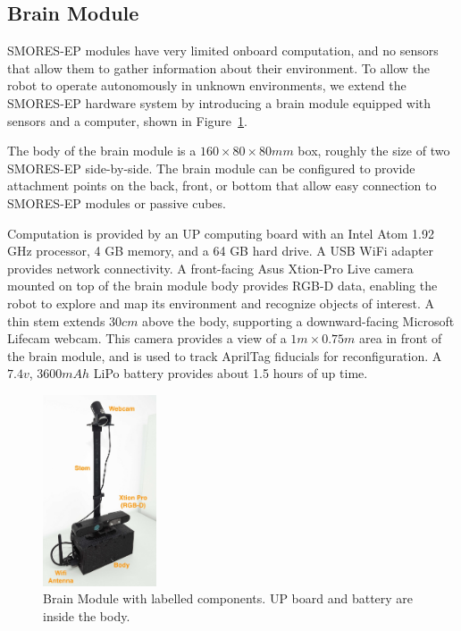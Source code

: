 \documentclass[conference]{IEEEtran}
\begin{document}
\subsection{Brain Module} %
\label{sec:sensor_module}
%
SMORES-EP modules have very limited onboard computation, and no sensors that allow them to gather information about their environment.  To allow the robot to operate autonomously in unknown environments, we extend the SMORES-EP hardware system by introducing a brain module equipped with sensors and a computer, shown in Figure~\ref{fig:sensor-module}.

The body of the brain module is a $160\times80\times80mm$ box, roughly the size of two SMORES-EP side-by-side.  The brain module can be configured to provide attachment points on the back, front, or bottom that allow easy connection to SMORES-EP modules or passive cubes.

Computation is provided by an UP computing board with an Intel Atom 1.92 GHz processor, 4 GB memory, and a 64 GB hard drive. A USB WiFi adapter provides network connectivity. A front-facing Asus Xtion-Pro Live camera mounted on top of the brain module body provides RGB-D data, enabling the robot to explore and map its environment and recognize objects of interest.  A thin stem extends $30cm$ above the body, supporting a downward-facing Microsoft Lifecam webcam.  This camera provides a view of a  $1m\times0.75m$ area in front of the brain module, and is used to track AprilTag \cite{olson2011apriltag} fiducials for reconfiguration. A $7.4v$, $3600mAh$ LiPo battery provides about 1.5 hours of up time.
%
\begin{figure}
\begin{center}
\includegraphics[width=0.3\textwidth]{images/sensor_module2.jpg}
\caption{Brain Module with labelled components.  UP board and battery are inside the body.      }
\label{fig:sensor-module}
\end{center}
\vspace{-2em}
\end{figure}
\end{document}
